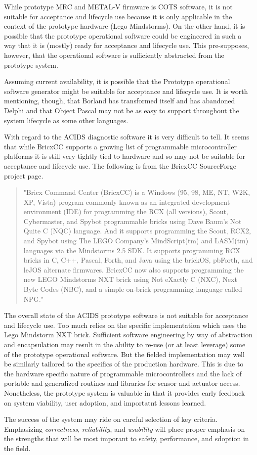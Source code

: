 \documentclass[letterpaper,10pt]{article}
\begin{document}
While prototype MRC and METAL-V firmware is COTS software, it is not suitable for acceptance and lifecycle use because it is only applicable in the context of the prototype hardware (Lego Mindstorms).  On the other hand, it is possible that the prototype operational software could be engineered in
such a way that it is (mostly) ready for acceptance and lifecycle use. This pre-supposes, however, that the
operational software is sufficiently abstracted from the prototype system.
\par
Assuming current availability, it is possible that the Prototype operational software generator might be suitable for
acceptance and lifecycle use. It is worth mentioning, though, that Borland has transformed itself and has
abandoned Delphi and that Object Pascal may not be as easy to support throughout the system lifecycle as some other languages.
\par
With regard to the ACIDS diagnostic software it is very difficult to tell.  It seems that while BricxCC supports a growing list of programmable microcontroller platforms it is still very tightly tied to hardware and so may not be suitable for acceptance and lifecycle use.  The following is from the BricxCC SourceForge project page.
\begin{quote}
"Bricx Command Center (BricxCC) is a Windows (95, 98, ME, NT, W2K, XP, Vista) program commonly known as an integrated development environment (IDE) for programming the RCX (all versions), Scout, Cybermaster, and Spybot programmable bricks using Dave Baum's Not Quite C (NQC) language. And it supports programming the Scout, RCX2, and Spybot using The LEGO Company's MindScript(tm) and LASM(tm) languages via the Mindstorms 2.5 SDK. It supports programming RCX bricks in C, C++, Pascal, Forth, and Java using the brickOS, pbForth, and leJOS alternate firmwares. BricxCC now also supports programming the new LEGO Mindstorms NXT brick using Not eXactly C (NXC), Next Byte Codes (NBC), and a simple on-brick programming language called NPG."
\end{quote}

\par
The overall state of the ACIDS prototype software is not suitable for acceptance and lifecycle use.  Too much relies on the specific implementation which uses the Lego Mindstorm NXT brick.  Sufficient software engineering by way of abstraction and encapsulation may result in the ability to re-use (or at least leverage) some of the  prototype operational software.  But the fielded implementation may well be similarly tailored to the specifics of the production hardware.  This is due to the hardware specific nature of programmable microcontrollers and the lack of portable and generalized routines and libraries for sensor and actuator access.  Nonetheless, the prototype system is valuable in that it provides early feedback on system viability, user adoption, and importatnt lessons learned.
\par
The success of the system may ride on careful selection of key criteria.  Emphasizing \emph{correctness}, \emph{reliability}, and \emph{usability} will place proper emphasis on the strengths that will be most imporant to safety, performance, and sdoption in the field.
\end{document}
